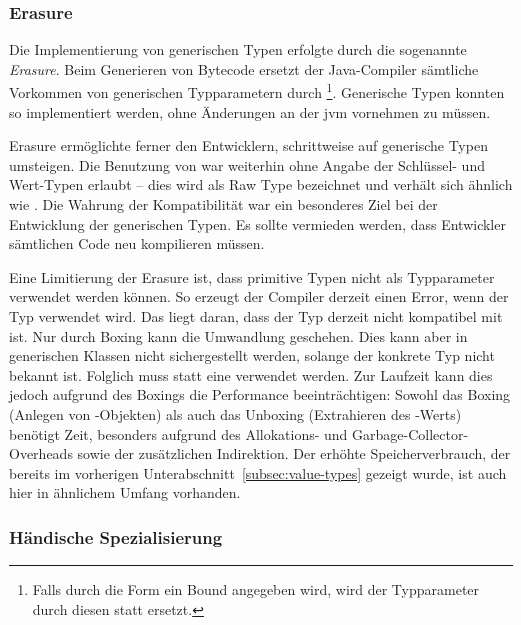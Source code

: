\subsubsection{Erasure}

Die Implementierung von generischen Typen erfolgte durch die sogenannte \emph{Erasure}.
Beim Generieren von Bytecode ersetzt der Java-Compiler sämtliche Vorkommen von generischen Typparametern durch \footnote{Falls durch die Form  ein Bound angegeben wird, wird der Typparameter durch diesen statt  ersetzt.}.
Generische Typen konnten so implementiert werden, ohne Änderungen an der \ac{jvm} vornehmen zu müssen.

Erasure ermöglichte ferner den Entwicklern, schrittweise auf generische Typen umsteigen.
Die Benutzung von  war weiterhin ohne Angabe der Schlüssel- und Wert-Typen erlaubt -- dies wird als Raw Type bezeichnet und verhält sich ähnlich wie .
Die Wahrung der Kompatibilität war ein besonderes Ziel bei der Entwicklung der generischen Typen.
Es sollte vermieden werden, dass Entwickler sämtlichen Code neu kompilieren müssen.

Eine Limitierung der Erasure ist, dass primitive Typen nicht als Typparameter verwendet werden können.
So erzeugt der Compiler derzeit einen Error, wenn der Typ  verwendet wird.
Das liegt daran, dass der Typ  derzeit nicht kompatibel mit  ist.
Nur durch Boxing kann die Umwandlung  geschehen.
Dies kann aber in generischen Klassen nicht sichergestellt werden, solange der konkrete Typ nicht bekannt ist.
Folglich muss statt  eine  verwendet werden.
Zur Laufzeit kann dies jedoch aufgrund des Boxings die Performance beeinträchtigen:
Sowohl das Boxing (Anlegen von -Objekten) als auch das Unboxing (Extrahieren des -Werts) benötigt Zeit, besonders aufgrund des Allokations- und Garbage-Collector-Overheads sowie der zusätzlichen Indirektion.
Der erhöhte Speicherverbrauch, der bereits im vorherigen Unterabschnitt~\ref{subsec:value-types} gezeigt wurde, ist auch hier in ähnlichem Umfang vorhanden.

\subsubsection{Händische Spezialisierung}

